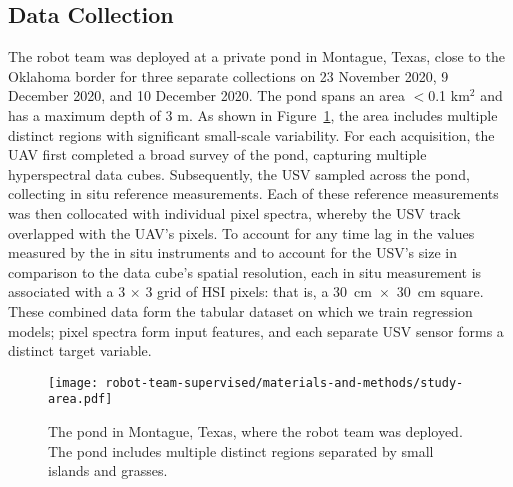 \subsection{Data Collection}

The robot team was deployed at a private pond in Montague, Texas, close to the Oklahoma border for three separate collections on 23 November 2020, 9 December 2020, and 10 December 2020. The pond spans an area $<$0.1 km$^{2}$ and has a maximum depth of 3 m. As shown in Figure~\ref{fig:study-area}, the area includes multiple distinct regions with significant small-scale variability. For each acquisition, the UAV first completed a broad survey of the pond, capturing multiple hyperspectral data cubes. Subsequently, the USV sampled across the pond, collecting in situ reference measurements. Each of these reference measurements was then collocated with individual pixel spectra, whereby the USV track overlapped with the UAV's pixels. To account for any time lag in the values measured by the in situ instruments and to account for the USV's size in comparison to the data cube's spatial resolution, each in situ measurement is associated with a 3 $\times$ 3 grid of HSI pixels: that is, a \mbox{30 cm $\times$ 30 cm} square. These combined data form the tabular dataset on which we train regression models; pixel spectra form input features, and each separate USV sensor forms a distinct target variable.

\begin{figure}[H]
  \centering
  \texttt{[image: robot-team-supervised/materials-and-methods/study-area.pdf]}
  \caption{The pond in Montague, Texas, where the robot team was deployed. The
    pond includes multiple distinct regions separated by small islands and
    grasses. \label{fig:study-area}}
\end{figure}




